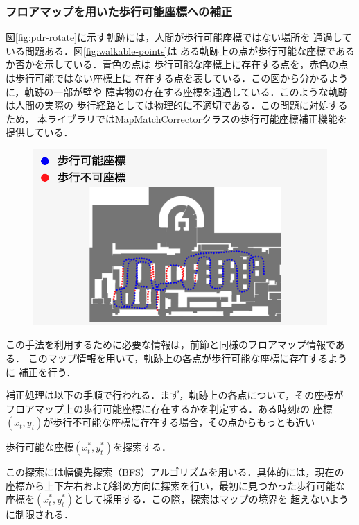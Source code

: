 
\subsubsection{フロアマップを用いた歩行可能座標への補正}

図\ref{fig:pdr-rotate}に示す軌跡には，人間が歩行可能座標ではない場所を
通過している問題ある．図\ref{fig:walkable-points}は
ある軌跡上の点が歩行可能な座標であるか否かを示している．青色の点は
歩行可能な座標上に存在する点を，赤色の点は歩行可能ではない座標上に
存在する点を表している．この図から分かるように，軌跡の一部が壁や
障害物の存在する座標を通過している．このような軌跡は人間の実際の
歩行経路としては物理的に不適切である．この問題に対処するため，
本ライブラリではMapMatchCorrectorクラスの歩行可能座標補正機能を提供している．

\begin{figure}[H]
    \centering
    \includegraphics[width=\linewidth]{../image/unwalkable_points.jpg}
    \caption{}    \label{fig:unwalkable_points}
\end{figure}

この手法を利用するために必要な情報は，前節と同様のフロアマップ情報である．
このマップ情報を用いて，軌跡上の各点が歩行可能な座標に存在するように
補正を行う．

補正処理は以下の手順で行われる．まず，軌跡上の各点について，その座標が
フロアマップ上の歩行可能座標に存在するかを判定する．ある時刻$t$の
座標$(x_t, y_t)$が歩行不可能な座標に存在する場合，その点からもっとも近い

歩行可能な座標$(x_t^*, y_t^*)$を探索する．

この探索には幅優先探索（BFS）アルゴリズムを用いる．具体的には，現在の
座標から上下左右および斜め方向に探索を行い，最初に見つかった歩行可能な
座標を$(x_t^*, y_t^*)$として採用する．この際，探索はマップの境界を
超えないように制限される．


